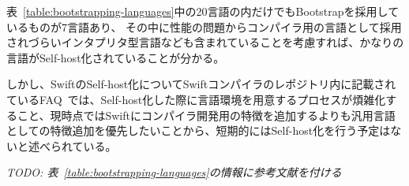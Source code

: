 表~\ref{table:bootstrapping-languages}中の20言語の内だけでもBootstrapを採用しているものが7言語あり、 その中に性能の問題からコンパイラ用の言語として採用されづらいインタプリタ型言語なども含まれていることを考慮すれば、かなりの言語がSelf-host化されていることが分かる。

しかし、SwiftのSelf-host化についてSwiftコンパイラのレポジトリ内に記載されているFAQ~\cite{swift-faq}では、Self-host化した際に言語環境を用意するプロセスが煩雑化すること、現時点ではSwiftにコンパイラ開発用の特徴を追加するよりも汎用言語としての特徴追加を優先したいことから、短期的にはSelf-host化を行う予定はないと述べられている。

\vspace{2em}
{\sl\small{TODO: 表~\ref{table:bootstrapping-languages}の情報に参考文献を付ける}}
\vspace{2em}

